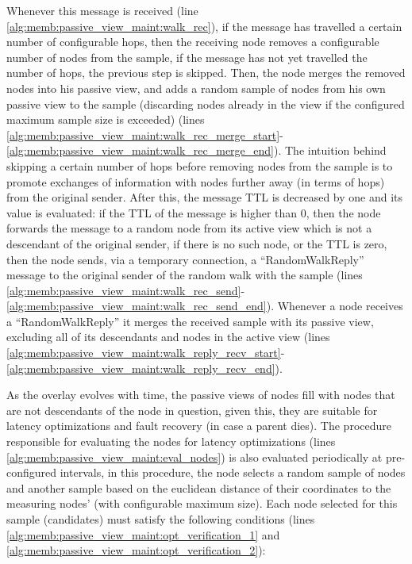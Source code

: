 

Whenever this message is received (line \ref{alg:memb:passive_view_maint:walk_rec}), if the message has travelled a certain number of configurable hops, then the receiving node removes a configurable number of nodes from the sample, if the message has not yet travelled the number of hops, the previous step is skipped. Then, the node merges the removed nodes into his passive view, and adds a random sample of nodes from his own passive view to the sample (discarding nodes already in the view if the configured maximum sample size is exceeded) (lines \ref{alg:memb:passive_view_maint:walk_rec_merge_start}-\ref{alg:memb:passive_view_maint:walk_rec_merge_end}). The intuition behind skipping a certain number of hops before removing nodes from the sample is to promote exchanges of information with nodes further away (in terms of hops) from the original sender. After this, the message TTL is decreased by one and its value is evaluated: if the TTL of the message is higher than 0, then the node forwards the message to a random node from its active view which is not a descendant of the original sender, if there is no such node, or the TTL is zero, then the node sends, via a temporary connection, a ``RandomWalkReply'' message to the original sender of the random walk with the sample (lines \ref{alg:memb:passive_view_maint:walk_rec_send}-\ref{alg:memb:passive_view_maint:walk_rec_send_end}). Whenever a node receives a ``RandomWalkReply'' it merges the received sample with its passive view, excluding all of its descendants and nodes in the active view (lines \ref{alg:memb:passive_view_maint:walk_reply_recv_start}-\ref{alg:memb:passive_view_maint:walk_reply_recv_end}).

As the overlay evolves with time, the passive views of nodes fill with nodes that are not descendants of the node in question, given this, they are suitable for latency optimizations and fault recovery (in case a parent dies). The procedure responsible for evaluating the nodes for latency optimizations (lines \ref{alg:memb:passive_view_maint:eval_nodes}) is also evaluated periodically at pre-configured intervals, in this procedure, the node selects a random sample of nodes and another sample based on the euclidean distance of their coordinates to the measuring nodes' (with configurable maximum size). Each node selected for this sample (candidates) must satisfy the following conditions (lines \ref{alg:memb:passive_view_maint:opt_verification_1} and \ref{alg:memb:passive_view_maint:opt_verification_2}): 

